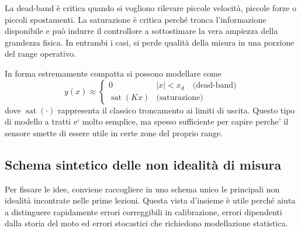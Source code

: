 \documentclass[11pt,a4paper]{article}
\begin{document}
La dead-band è critica quando si vogliono rilevare piccole velocità, piccole forze o piccoli spostamenti. La saturazione è critica perché tronca l’informazione disponibile e può indurre il controllore a sottostimare la vera ampiezza della grandezza fisica. In entrambi i casi, si perde qualità della misura in una porzione del range operativo.

In forma estremamente compatta si possono modellare come
\[
y(x)\approx
\begin{cases}
0 & |x|<x_d \quad \text{(dead-band)}\\
\operatorname{sat}(Kx) & \text{(saturazione)}
\end{cases}
\]
dove $\operatorname{sat}(\cdot)$ rappresenta il classico troncamento ai limiti di uscita. Questo tipo di modello a tratti e` molto semplice, ma spesso sufficiente per capire perche' il sensore smette di essere utile in certe zone del proprio range.

\subsection{Schema sintetico delle non idealit\`a di misura}

Per fissare le idee, conviene raccogliere in uno schema unico le principali non idealit\`a incontrate nelle prime lezioni. Questa vista d’insieme \`e utile perch\'e aiuta a distinguere rapidamente errori correggibili in calibrazione, errori dipendenti dalla storia del moto ed errori stocastici che richiedono modellazione statistica.
\end{document}

